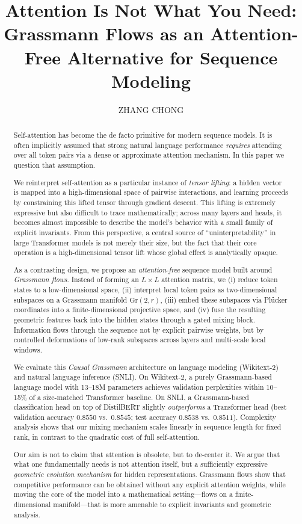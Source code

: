 \documentclass[11pt]{article}
\title{\textbf{Attention Is Not What You Need: \\ Grassmann Flows as an Attention-Free Alternative for Sequence Modeling}}
\author{ZHANG CHONG}
\date{}
\newcommand{\Gr}{\mathrm{Gr}}
\begin{document}
\maketitle

\begin{abstract}
Self-attention has become the de facto primitive for modern sequence models. It is often implicitly assumed that strong natural language performance \emph{requires} attending over all token pairs via a dense or approximate attention mechanism. In this paper we question that assumption.

We reinterpret self-attention as a particular instance of \emph{tensor lifting}: a hidden vector is mapped into a high-dimensional space of pairwise interactions, and learning proceeds by constraining this lifted tensor through gradient descent. This lifting is extremely expressive but also difficult to trace mathematically; across many layers and heads, it becomes almost impossible to describe the model's behavior with a small family of explicit invariants. From this perspective, a central source of ``uninterpretability'' in large Transformer models is not merely their size, but the fact that their core operation is a high-dimensional tensor lift whose global effect is analytically opaque.

As a contrasting design, we propose an \emph{attention-free} sequence model built around \emph{Grassmann flows}. Instead of forming an $L\times L$ attention matrix, we (i) reduce token states to a low-dimensional space, (ii) interpret local token pairs as two-dimensional subspaces on a Grassmann manifold $\Gr(2,r)$, (iii) embed these subspaces via Pl\"ucker coordinates into a finite-dimensional projective space, and (iv) fuse the resulting geometric features back into the hidden states through a gated mixing block. Information flows through the sequence not by explicit pairwise weights, but by controlled deformations of low-rank subspaces across layers and multi-scale local windows.

We evaluate this \emph{Causal Grassmann} architecture on language modeling (Wikitext-2) and natural language inference (SNLI). On Wikitext-2, a purely Grassmann-based language model with 13--18M parameters achieves validation perplexities within 10--15\% of a size-matched Transformer baseline. On SNLI, a Grassmann-based classification head on top of DistilBERT slightly \emph{outperforms} a Transformer head (best validation accuracy $0.8550$ vs.\ $0.8545$; test accuracy $0.8538$ vs.\ $0.8511$). Complexity analysis shows that our mixing mechanism scales linearly in sequence length for fixed rank, in contrast to the quadratic cost of full self-attention.

Our aim is not to claim that attention is obsolete, but to de-center it. We argue that what one fundamentally needs is not attention itself, but a sufficiently expressive \emph{geometric evolution mechanism} for hidden representations. Grassmann flows show that competitive performance can be obtained without any explicit attention weights, while moving the core of the model into a mathematical setting---flows on a finite-dimensional manifold---that is more amenable to explicit invariants and geometric analysis.
\end{abstract}
\end{document}
